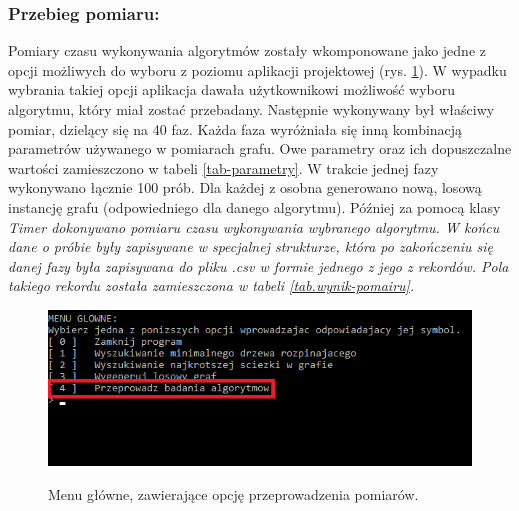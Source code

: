 \documentclass[a4paper,12pt]{article}
\begin{document}
\subsubsection{Przebieg pomiaru:}
Pomiary czasu wykonywania algorytmów zostały wkomponowane jako jedne z opcji możliwych do wyboru z poziomu aplikacji projektowej (rys. \ref{fig.opcja-badanie}). W wypadku wybrania takiej opcji aplikacja dawała użytkownikowi możliwość wyboru algorytmu, który miał zostać przebadany. Następnie wykonywany był właściwy pomiar, dzielący się na 40 faz. Każda faza wyróżniała się inną kombinacją parametrów używanego w pomiarach grafu. Owe parametry oraz ich dopuszczalne wartości zamieszczono w tabeli \ref{tab-parametry}. W trakcie jednej fazy wykonywano łącznie 100 prób. Dla każdej z osobna generowano nową, losową instancję grafu (odpowiedniego dla danego algorytmu). Później za pomocą klasy \it Timer \rm dokonywano pomiaru czasu wykonywania wybranego algorytmu. W końcu dane o próbie były zapisywane w specjalnej strukturze, która po zakończeniu się danej fazy była zapisywana do pliku \it *.csv \rm w formie jednego z jego z rekordów. Pola takiego rekordu została zamieszczona w tabeli \ref{tab.wynik-pomairu}.
\begin{figure}[H]
	\centering
	\caption{\centering Menu główne, zawierające opcję przeprowadzenia pomiarów.}
	\includegraphics[width=12cm]{fig1.png}
	\label{fig.opcja-badanie}
\end{figure}
\end{document}
